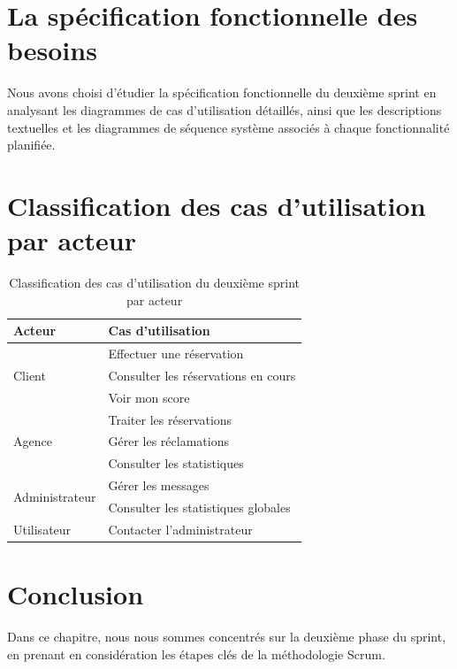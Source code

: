\section{La spécification fonctionnelle des besoins}
\label{sec:spec_fonctionnelle_sprint2}
Nous avons choisi d'étudier la spécification fonctionnelle du deuxième sprint en analysant les
diagrammes de cas d'utilisation détaillés, ainsi que les descriptions textuelles et les
diagrammes de séquence système associés à chaque fonctionnalité planifiée.

\section{Classification des cas d'utilisation par acteur}
\label{sec:classification_cas_sprint2}

\begin{table}[!htbp]
\centering
\caption{Classification des cas d'utilisation du deuxième sprint par acteur}
\label{tab:classification-cas-sprint2}
\renewcommand{\arraystretch}{1.3}
\begin{tabular}{|l|p{10cm}|}
\hline
\textbf{Acteur} & \textbf{Cas d'utilisation} \\
\hline
\multirow{3}{*}{Client} & Effectuer une réservation \\
\cline{2-2}
 & Consulter les réservations en cours \\
\cline{2-2}
 & Voir mon score \\
\hline
\multirow{3}{*}{Agence} & Traiter les réservations \\
\cline{2-2}
 & Gérer les réclamations \\
\cline{2-2}
 & Consulter les statistiques \\
\hline
\multirow{2}{*}{Administrateur} & Gérer les messages \\
\cline{2-2}
 & Consulter les statistiques globales \\
\hline
Utilisateur & Contacter l'administrateur \\
\hline
\end{tabular}
\end{table}

\section{Conclusion}
Dans ce chapitre, nous nous sommes concentrés sur la deuxième phase du sprint,
en prenant en considération les étapes clés de la méthodologie Scrum.




